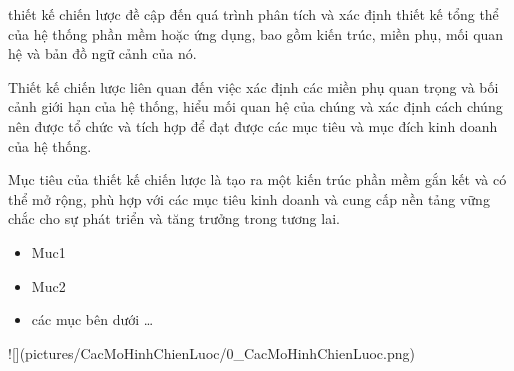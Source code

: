 
thiết kế chiến lược đề cập đến quá trình phân tích và xác định thiết kế tổng thể của hệ thống phần mềm hoặc ứng dụng, bao gồm kiến trúc, miền phụ, mối quan hệ và bản đồ ngữ cảnh của nó.


Thiết kế chiến lược liên quan đến việc xác định các miền phụ quan trọng và bối cảnh giới hạn của hệ thống, hiểu mối quan hệ của chúng và xác định cách chúng nên được tổ chức và tích hợp để đạt được các mục tiêu và mục đích kinh doanh của hệ thống.


Mục tiêu của thiết kế chiến lược là tạo ra một kiến trúc phần mềm gắn kết và có thể mở rộng, phù hợp với các mục tiêu kinh doanh và cung cấp nền tảng vững chắc cho sự phát triển và tăng trưởng trong tương lai.



\begin{itemize}
    
    \item Muc1
    
    \item Muc2
    \item   các mục bên dưới \dots

\end{itemize}




![](pictures/CacMoHinhChienLuoc/0_CacMoHinhChienLuoc.png)











